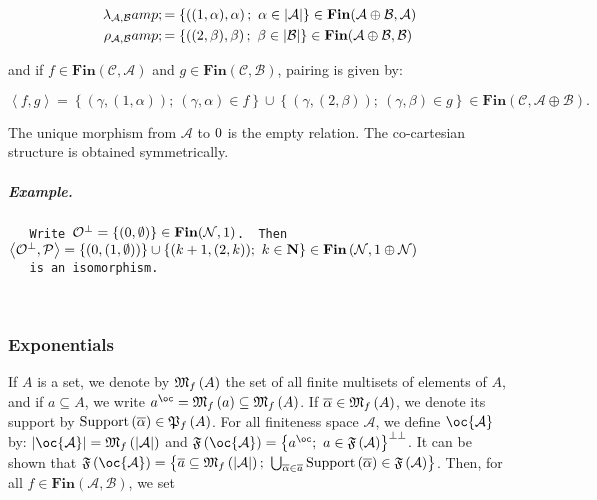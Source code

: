 \begin{align}
\lambda_{{\mathcal A},{\mathcal B}}&amp;=\left\{\left((1,\alpha),\alpha\right);\ \alpha\in\web{\mathcal A}\right\}
\in\mathbf{Fin}({\mathcal A}\oplus{\mathcal B},{\mathcal A}) \\
\rho_{{\mathcal A},{\mathcal B}}&amp;=\left\{\left((2,\beta),\beta\right);\ \beta\in\web{\mathcal B}\right\}
\in\mathbf{Fin}({\mathcal A}\oplus{\mathcal B},{\mathcal B}) 
\end{align}

and if \(f\in\mathbf{Fin}({\mathcal C},{\mathcal A})\) and
\(g\in\mathbf{Fin}({\mathcal C},{\mathcal B})\), pairing is given by:

\(\left\langle f,g\right\rangle = \left\{\left(\gamma,(1,\alpha)\right);\ (\gamma,\alpha)\in f\right\} \cup \left\{\left(\gamma,(2,\beta)\right);\ (\gamma,\beta)\in g\right\} \in\mathbf{Fin}({\mathcal C},{\mathcal A}\oplus{\mathcal B}).\)

The unique morphism from \({\mathcal A}\) to \(0\) is the empty
relation. The co-cartesian structure is obtained symmetrically.

\subparagraph{Example.}\label{example.-2}

\texttt{~~~Write~}\({\mathcal O}^\bot=\left\{(0,\emptyset)\right\}\in\mathbf{Fin}({\mathcal N},1)\)\texttt{.~~Then~}\(\left\langle{{\mathcal O}^\bot},{\mathcal{P}}\right\rangle =\{ (0,(1,\emptyset)) \}\cup \{ (k+1,(2,k)) ;\  k\in{\mathbf N} \} \in\mathbf{Fin}\left({\mathcal N},1\oplus{\mathcal N}\right)\)\\
\texttt{~~~is~an~isomorphism.}\\
\texttt{~~~}\\
\texttt{~~~\ }

\subsubsection{Exponentials}\label{exponentials-1}

If \(A\) is a set, we denote by \(\mathfrak{M}_f\left(A\right)\) the set of all finite
multisets of elements of \(A\), and if \(a\subseteq A\), we write
\(a^{\oc}=\finmulset a\subseteq\finmulset A\). If
\(\overline\alpha\in\mathfrak{M}_f\left(A\right)\), we denote its support by
\(\mathrm{Support}\left(\overline \alpha\right)\in\mathfrak{P}_f\left(A\right)\). For
all finiteness space \({\mathcal A}\), we define \(\oc {\mathcal A}\)
by: \(\web{\oc {\mathcal A}}= \finmulset{\web{{\mathcal A}}}\) and
\(\mathfrak F\left(\oc{\mathcal A}\right)=\left\{a^{\oc};\  a\in\mathfrak F\left({\mathcal A}\right)\right\}\biorth\).
It can be shown that
\(\mathfrak F\left(\oc{\mathcal A}\right) = \left\{\overline a\subseteq\finmulset{\web{{\mathcal A}}};\ \bigcup_{\overline\alpha\in \overline a}\mathrm{Support}\left(\overline \alpha\right)\in\mathfrak F\left(\mathcal A\right)\right\}\).
Then, for all \(f\in\mathbf{Fin}({\mathcal A},{\mathcal B})\), we set

